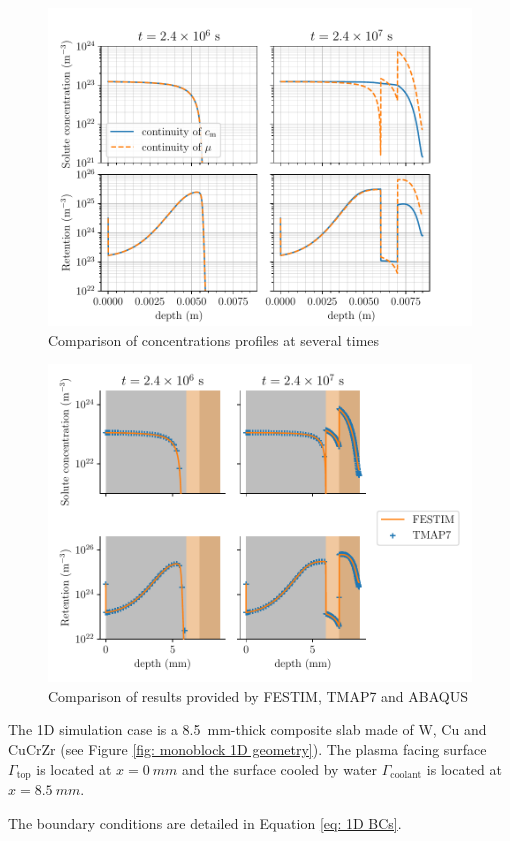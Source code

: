 \begin{figure}[ht]
    \centering
    \includegraphics[width=0.75\linewidth]{Figures/Chapter3/monoblocks/interface_condition/iter case/comparison_profiles.pdf}
    \caption{Comparison of concentrations profiles at several times}
    \label{fig: concentrations profiles 1D}
\end{figure}

\begin{figure}[ht]
    \centering
    \includegraphics[width=0.75\linewidth]{Figures/Chapter3/monoblocks/interface_condition/iter case/comparison_codes.pdf}
    \caption{Comparison of results provided by FESTIM, TMAP7 and ABAQUS}
    \label{fig: code comparison}
\end{figure}

The 1D simulation case is a \SI{8.5}{mm}-thick composite slab made of W, Cu and CuCrZr (see Figure \ref{fig: monoblock 1D geometry}).
The plasma facing surface $\Gamma_\mathrm{top}$ is located at $x=\SI{0}{mm}$ and the surface cooled by water $\Gamma_\mathrm{coolant}$ is located at $x=\SI{8.5}{mm}$.


The boundary conditions are detailed in Equation \ref{eq: 1D BCs}.

